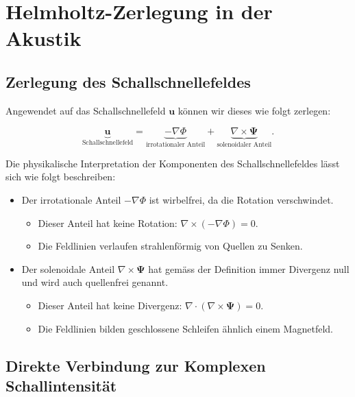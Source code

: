 %
%
%
%
\section{Helmholtz-Zerlegung in der Akustik
\label{helmholtz:section:Helmholtz_Zerlegung_Akustik}}


\subsection{Zerlegung des Schallschnellefeldes
\label{helmholtz:subsection:Zerlegung_Schallschnelle}}
Angewendet auf das Schallschnellefeld $\mathbf{u}$ können wir dieses wie folgt zerlegen:
 
\begin{equation}
\underbrace{\mathbf{u}}_{\text{Schallschnellefeld}} =  \underbrace{-\nabla \Phi}_{\text{irrotationaler~Anteil}} + \underbrace{\nabla \times \mathbf{\Psi}}_{\text{solenoidaler~Anteil}}.
\end{equation}
 
\noindent Die physikalische Interpretation der Komponenten des Schallschnellefeldes lässt sich wie folgt beschreiben:
 
\begin{itemize}
\item Der irrotationale Anteil $-\nabla \Phi$ ist wirbelfrei, da die Rotation verschwindet.
\begin{itemize}
\item Dieser Anteil hat keine Rotation: $\nabla \times (-\nabla \Phi) = 0$.
\item Die Feldlinien verlaufen strahlenförmig von Quellen zu Senken.
\end{itemize}
 
\item Der solenoidale Anteil $\nabla \times \mathbf{\Psi}$ hat gemäss der Definition immer Divergenz null und wird auch quellenfrei genannt.
\begin{itemize}
\item Dieser Anteil hat keine Divergenz: $\nabla \cdot (\nabla \times \mathbf{\Psi}) = 0$.
\item Die Feldlinien bilden geschlossene Schleifen ähnlich einem Magnetfeld.
\end{itemize}
\end{itemize}

\subsection{Direkte Verbindung zur Komplexen Schallintensität
\label{helmholtz:subsection:Zerlegung_Schallschnelle}}

